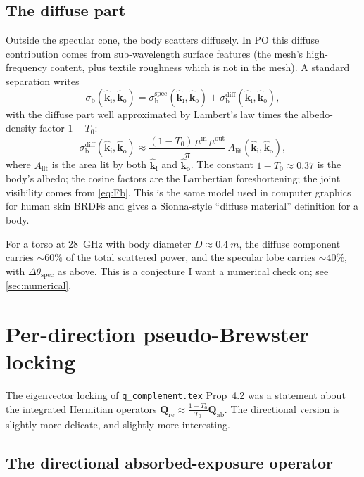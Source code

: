 \documentclass[11pt,a4paper]{article}
\theoremstyle{definition}
\newcommand{\Qabs}{\mathbf{Q}_{\mathrm{ab}}}
\newcommand{\Qref}{\mathbf{Q}_{\mathrm{re}}}
\newcommand{\kin}{\hat{\bm{k}}_{\mathrm{i}}}
\newcommand{\kout}{\hat{\bm{k}}_{\mathrm{o}}}
\newcommand{\sigb}{\sigma_{\mathrm{b}}}
\begin{document}
\subsection{The diffuse part}

Outside the specular cone, the body scatters diffusely.  In PO this
diffuse contribution comes from sub-wavelength surface features (the
mesh's high-frequency content, plus textile roughness which is not
in the mesh).  A standard separation writes
\begin{equation}\label{eq:rho-diffuse}
  \sigb(\kin,\kout)
  =\sigb^{\mathrm{spec}}(\kin,\kout)+\sigb^{\mathrm{diff}}(\kin,\kout),
\end{equation}
with the diffuse part well approximated by Lambert's law times the
albedo-density factor $1-T_0$:
\begin{equation}\label{eq:Lambert}
  \sigb^{\mathrm{diff}}(\kin,\kout)\approx
  \frac{(1-T_0)\,\mu^{\mathrm{in}}\,\mu^{\mathrm{out}}}{\pi}
  \,A_{\mathrm{lit}}(\kin,\kout),
\end{equation}
where $A_{\mathrm{lit}}$ is the area lit by both
$\kin$ and $\kout$.  The constant $1-T_0\approx 0.37$ is the body's
albedo; the cosine factors are the Lambertian foreshortening; the
joint visibility comes from \cref{eq:Fb}.  This is the same model
used in computer graphics for human skin BRDFs and gives a Sionna-style
``diffuse material'' definition for a body.

For a torso at \SI{28}{GHz} with body diameter
$D\approx\SI{0.4}{m}$, the diffuse component carries
$\sim 60\%$ of the total scattered power, and the specular lobe
carries $\sim 40\%$, with $\Delta\theta_{\mathrm{spec}}$ as above.
This is a conjecture I want a numerical check on; see
\cref{sec:numerical}.

\section{Per-direction pseudo-Brewster locking}\label{sec:lock}

The eigenvector locking of \texttt{q\_complement.tex} Prop~4.2 was a
statement about the integrated Hermitian operators
$\Qref\approx\frac{1-T_0}{T_0}\Qabs$.  The directional version is
slightly more delicate, and slightly more interesting.

\subsection{The directional absorbed-exposure operator}
\end{document}
